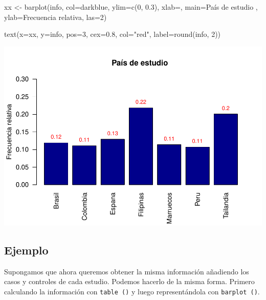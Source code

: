 \documentclass[
]{book}
\newenvironment{Shaded}{\begin{snugshade}}{\end{snugshade}}
\newcommand{\AttributeTok}[1]{\textcolor[rgb]{0.77,0.63,0.00}{#1}}
\newcommand{\DecValTok}[1]{\textcolor[rgb]{0.00,0.00,0.81}{#1}}
\newcommand{\FloatTok}[1]{\textcolor[rgb]{0.00,0.00,0.81}{#1}}
\newcommand{\FunctionTok}[1]{\textcolor[rgb]{0.00,0.00,0.00}{#1}}
\newcommand{\NormalTok}[1]{#1}
\newcommand{\OtherTok}[1]{\textcolor[rgb]{0.56,0.35,0.01}{#1}}
\newcommand{\StringTok}[1]{\textcolor[rgb]{0.31,0.60,0.02}{#1}}
\begin{document}
\begin{Shaded}
\begin{Highlighting}[]
\NormalTok{xx }\OtherTok{\textless{}{-}} \FunctionTok{barplot}\NormalTok{(info, }\AttributeTok{col=}\StringTok{\textquotesingle{}darkblue\textquotesingle{}}\NormalTok{, }\AttributeTok{ylim=}\FunctionTok{c}\NormalTok{(}\DecValTok{0}\NormalTok{, }\FloatTok{0.3}\NormalTok{),}
              \AttributeTok{xlab=}\StringTok{\textquotesingle{}\textquotesingle{}}\NormalTok{, }\AttributeTok{main=}\StringTok{\textquotesingle{}País de estudio \textquotesingle{}}\NormalTok{,}
              \AttributeTok{ylab=}\StringTok{\textquotesingle{}Frecuencia relativa\textquotesingle{}}\NormalTok{, }\AttributeTok{las=}\DecValTok{2}\NormalTok{)}

\FunctionTok{text}\NormalTok{(}\AttributeTok{x=}\NormalTok{xx, }\AttributeTok{y=}\NormalTok{info, }\AttributeTok{pos=}\DecValTok{3}\NormalTok{, }\AttributeTok{cex=}\FloatTok{0.8}\NormalTok{, }\AttributeTok{col=}\StringTok{"red"}\NormalTok{,}
     \AttributeTok{label=}\FunctionTok{round}\NormalTok{(info, }\DecValTok{2}\NormalTok{))}
\end{Highlighting}
\end{Shaded}

\includegraphics{fig/unnamed-chunk-101-1.pdf}

\hypertarget{ejemplo-11}{%
\subsection*{Ejemplo}\label{ejemplo-11}}

Supongamos que ahora queremos obtener la misma información añadiendo los casos y controles de cada estudio. Podemos hacerlo de la misma forma. Primero calculando la información con \texttt{table\ ()} y luego representándola con \texttt{barplot\ ()}.
\end{document}
